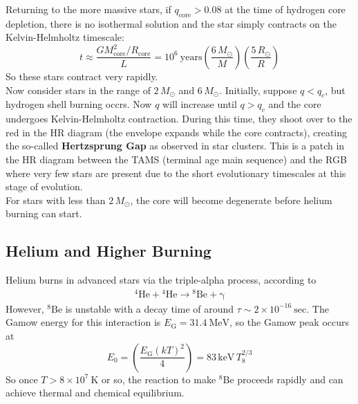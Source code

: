 \documentclass[10pt]{article}
\numberwithin{equation}{section}
\newcommand{\n}{\noindent}
\begin{document}
    \n Returning to the more massive stars, if
    $q_{\mathrm{core}}>0.08$ at the time of hydrogen core depletion,
    there is no isothermal solution and the star simply contracts on
    the Kelvin-Helmholtz timescale:
    \begin{equation}
      \label{eq:263}
      t\approx \frac{GM_{\mathrm{core}}^2/R_{\mathrm{core}}}{L}=10^6\ 
\mathrm{years}\left(\frac{6\,M_\odot}{M}\right)\left(\frac{5\,R_\odot}{R}
\right)
    \end{equation}
    So these stars contract very rapidly.\\
    
    \n Now consider stars in the range of $2\,M_\odot$ and $6\,M_\odot$.
    Initially, suppose $q<q_c$, but hydrogen shell burning occrs. Now $q$ will
    increase until $q>q_c$ and the core undergoes Kelvin-Helmholtz contraction.
    During this time, they shoot over to the red in the HR diagram (the
    envelope expands while the core contracts), creating the so-called
    \textbf{Hertzsprung Gap} as observed in star clusters. This is a patch in
    the HR diagram between the TAMS (terminal age main sequence) and the RGB
    where very few stars are present due to the short evolutionary timescales
    at this stage of evolution.\\
    
    \n For stars with less than $2\,M_\odot$, the core will become degenerate
    before helium burning can start.\\

    \subsection{Helium and Higher Burning}
    \label{sec:helium-burning}

    Helium burns in advanced stars via the triple-alpha process,
    according to
    \begin{align}
      \label{eq:264}
      \mathrm{{}^4He+{}^4He\to{}^8Be+\gamma}
    \end{align}
    However, $\mathrm{{}^8Be}$ is unstable with a decay time of around
    $\tau\sim 2\times 10^{-16}\ \mathrm{sec}$.  The Gamow energy for
    this interaction is $E_{\mathrm{G}}=31.4\ \mathrm{MeV}$, so the
    Gamow peak occurs at
    \begin{equation}
      \label{eq:265}
      E_0=\left(\frac{E_{\mathrm{G}}(kT)^2}{4}\right)=83\,\mathrm{keV}\,T_8^
{2/3}
    \end{equation}
    So once $T>8\times 10^7\ \mathrm{K}$ or so, the reaction to make
    $\mathrm{{}^8Be}$ proceeds rapidly and can achieve thermal and
    chemical equilibrium.\\
    
\end{document}
